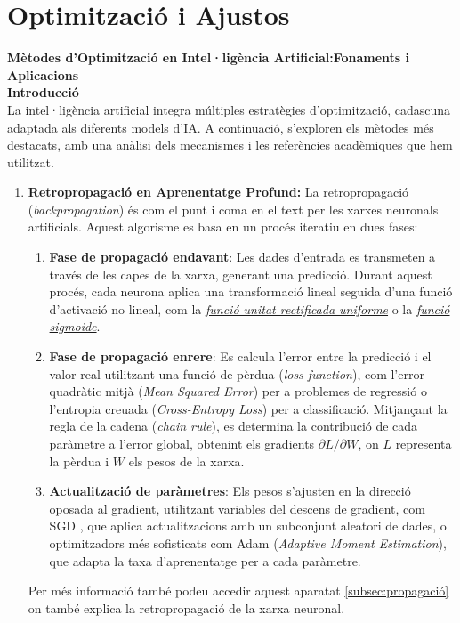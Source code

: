 \chapter{Optimització i Ajustos}
\textbf{Mètodes d'Optimització en Intel·ligència Artificial:Fonaments i Aplicacions}\\
   \textbf{Introducció}\\
La intel·ligència artificial integra múltiples estratègies d'optimització, cadascuna adaptada als diferents models d'IA. A continuació, s'exploren els mètodes més destacats, amb una anàlisi dels mecanismes i les referències acadèmiques que hem utilitzat.
\begin{enumerate}
 \item \textbf{Retropropagació en Aprenentatge Profund:} La retropropagació (\textit{backpropagation}) és com el punt i coma en el text per les xarxes neuronals artificials. Aquest algorisme es basa en un procés iteratiu en dues fases:
    \begin{enumerate}
       \item \textbf{Fase de propagació endavant}: Les dades d'entrada es transmeten a través de les capes de la xarxa, generant una predicció. Durant aquest procés, cada neurona aplica una transformació lineal seguida d'una funció d'activació no lineal, com la \textit{\hyperlink{subsec:1}{funció unitat rectificada uniforme}} o la \textit{\hyperlink{3.7.1}{funció sigmoide}}.
     \item \textbf{Fase de propagació enrere}: Es calcula l'error entre la predicció i el valor real utilitzant una funció de pèrdua (\textit{loss function}), com l'error quadràtic mitjà (\textit{Mean Squared Error}) per a problemes de regressió o l'entropia creuada (\textit{Cross-Entropy Loss}) per a classificació. Mitjançant la regla de la cadena (\textit{chain rule}), es determina la contribució de cada paràmetre a l'error global, obtenint els gradients $\partial L/\partial W$, on $L$ representa la pèrdua i $W$ els pesos de la xarxa.
     \item \textbf{Actualització de paràmetres}: Els pesos s'ajusten en la direcció oposada al gradient, utilitzant variables del descens de gradient, com SGD \textit{}, que aplica actualitzacions amb un subconjunt aleatori de dades, o optimitzadors més sofisticats com Adam (\textit{Adaptive Moment Estimation}), que adapta la taxa d'aprenentatge per a cada paràmetre.
    \end{enumerate}
 Per més informació també podeu accedir aquest  aparatat \ref{subsec:propagació} on també explica la retropropagació de la xarxa neuronal.


\end{enumerate}
